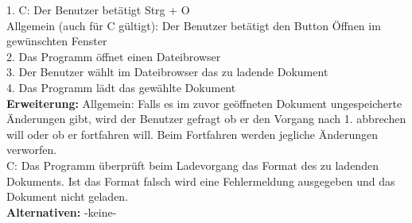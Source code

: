 \documentclass[a4paper]{scrreprt}
\begin{document}
1. C: Der Benutzer betätigt Strg + O \\
Allgemein (auch für C gültigt): Der Benutzer betätigt den Button Öffnen im gewünschten Fenster \\
2. Das Programm öffnet einen Dateibrowser\\
3. Der Benutzer wählt im Dateibrowser das zu ladende Dokument \\
4. Das Programm lädt das gewählte Dokument \\
\textbf {Erweiterung:} Allgemein: Falls es im zuvor geöffneten Dokument ungespeicherte Änderungen gibt, wird der Benutzer gefragt ob er den Vorgang nach 1. abbrechen will oder ob er fortfahren will. Beim Fortfahren werden jegliche Änderungen verworfen. \\
C: Das Programm überprüft beim Ladevorgang das Format des zu ladenden Dokuments. Ist das Format falsch wird eine Fehlermeldung ausgegeben und das Dokument nicht geladen. \\
\textbf {Alternativen:} -keine- \\ \\
\end{document}
